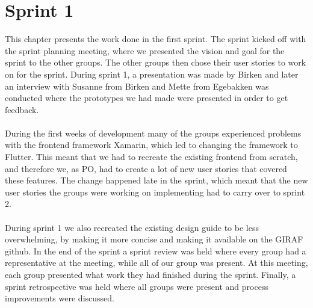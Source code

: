 \chapter{Sprint 1}
This chapter presents the work done in the first sprint.
The sprint kicked off with the sprint planning meeting, where we presented the vision and goal for the sprint to the other groups.
The other groups then chose their user stories to work on for the sprint.
During sprint 1, a presentation was made by Birken and later an interview with Susanne from Birken and Mette from Egebakken was conducted where the prototypes we had made were presented in order to get feedback. 
\\\\
During the first weeks of development many of the groups experienced problems with the frontend framework Xamarin, which led to changing the framework to Flutter.
This meant that we had to recreate the existing frontend from scratch, and therefore we, as PO, had to create a lot of new user stories that covered these features.
The change happened late in the sprint, which meant that the new user stories the groups were working on implementing had to carry over to sprint 2.
\\\\
During sprint 1 we also recreated the existing design guide to be less overwhelming, by making it more concise and making it available on the GIRAF github.
In the end of the sprint a sprint review was held where every group had a representative at the meeting, while all of our group was present. At this meeting, each group presented what work they had finished during the sprint.
Finally, a sprint retrospective was held where all groups were present and process improvements were discussed.
